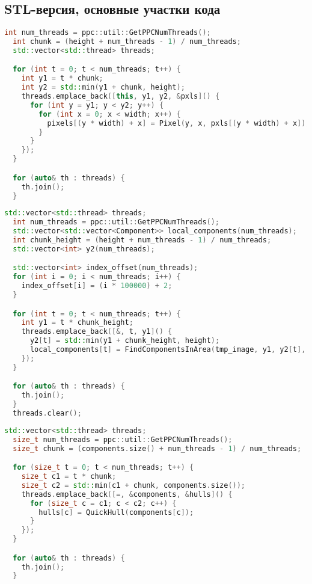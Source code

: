 \documentclass[12pt]{article}
\begin{document}
\subsection{STL-версия, основные участки кода}
\label{appendix:stl_1}
\begin{lstlisting}[language=C++, caption={STL-версия, Создание объекта Image в конструкторе Image::Image()}]
int num_threads = ppc::util::GetPPCNumThreads();
  int chunk = (height + num_threads - 1) / num_threads;
  std::vector<std::thread> threads;

  for (int t = 0; t < num_threads; t++) {
    int y1 = t * chunk;
    int y2 = std::min(y1 + chunk, height);
    threads.emplace_back([this, y1, y2, &pxls]() {
      for (int y = y1; y < y2; y++) {
        for (int x = 0; x < width; x++) {
          pixels[(y * width) + x] = Pixel(y, x, pxls[(y * width) + x]);
        }
      }
    });
  }

  for (auto& th : threads) {
    th.join();
  }
\end{lstlisting}
\label{appendix:stl_2}
\begin{lstlisting}[language=C++, caption={STL-версия, Поиск компонент по "полосам" изображения в функции FindComponentsSTL()}]
std::vector<std::thread> threads;
  int num_threads = ppc::util::GetPPCNumThreads();
  std::vector<std::vector<Component>> local_components(num_threads);
  int chunk_height = (height + num_threads - 1) / num_threads;
  std::vector<int> y2(num_threads);

  std::vector<int> index_offset(num_threads);
  for (int i = 0; i < num_threads; i++) {
    index_offset[i] = (i * 100000) + 2;
  }

  for (int t = 0; t < num_threads; t++) {
    int y1 = t * chunk_height;
    threads.emplace_back([&, t, y1]() {
      y2[t] = std::min(y1 + chunk_height, height);
      local_components[t] = FindComponentsInArea(tmp_image, y1, y2[t], index_offset[t]);
    });
  }

  for (auto& th : threads) {
    th.join();
  }
  threads.clear();
\end{lstlisting}
\label{appendix:stl_3}
\begin{lstlisting}[language=C++, caption={STL-версия, Построение оболочки для каждой из компонент в функции QuickHullAllSTL()}]
  std::vector<std::thread> threads;
  size_t num_threads = ppc::util::GetPPCNumThreads();
  size_t chunk = (components.size() + num_threads - 1) / num_threads;

  for (size_t t = 0; t < num_threads; t++) {
    size_t c1 = t * chunk;
    size_t c2 = std::min(c1 + chunk, components.size());
    threads.emplace_back([=, &components, &hulls]() {
      for (size_t c = c1; c < c2; c++) {
        hulls[c] = QuickHull(components[c]);
      }
    });
  }

  for (auto& th : threads) {
    th.join();
  }
\end{lstlisting}
\label{appendix:stl_4}
\end{document}
